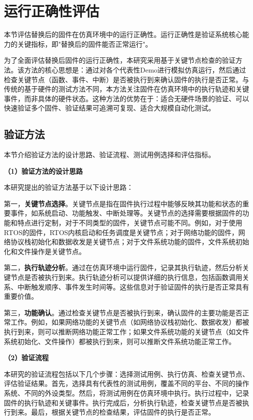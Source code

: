 \section{运行正确性评估}
\label{sec:eval_emu}

本节评估替换后的固件在仿真环境中的运行正确性。运行正确性是验证系统核心能力的关键指标，即"替换后的固件能否正常运行"。

为了全面评估替换后固件的运行正确性，本研究采用基于关键节点检查的验证方法。该方法的核心思想是：通过对各个代表性Demo进行模拟仿真运行，然后通过检查关键节点（函数、事件、中断）是否被执行到来确认固件的执行是否正常。与传统的基于硬件的测试方法不同，本方法关注固件在仿真环境中的执行轨迹和关键事件，而非具体的硬件状态。这种方法的优势在于：适合无硬件场景的验证、可以快速验证多个固件、验证结果可追溯可复现、适合大规模自动化测试。

\subsection{验证方法}

本节介绍验证方法的设计思路、验证流程、测试用例选择和评估指标。

\textbf{（1）验证方法的设计思路}

本研究提出的验证方法基于以下设计思路：

第一，\textbf{关键节点选择}。关键节点是指在固件执行过程中能够反映其功能和状态的重要事件，如系统启动、功能触发、中断处理等。关键节点的选择需要根据固件的功能和特点进行定制，对于不同类型的固件，关键节点可能不同。例如，对于使用RTOS的固件，RTOS内核启动和任务调度是关键节点；对于网络功能的固件，网络协议栈初始化和数据收发是关键节点；对于文件系统功能的固件，文件系统初始化和文件操作是关键节点。

第二，\textbf{执行轨迹分析}。通过在仿真环境中运行固件，记录其执行轨迹，然后分析关键节点是否被执行到来。执行轨迹分析可以提供详细的执行信息，包括函数调用关系、中断触发顺序、事件发生时间等。这些信息对于验证固件的执行是否正常具有重要价值。

第三，\textbf{功能确认}。通过检查关键节点是否被执行到来，确认固件的主要功能是否正常工作。例如，如果网络功能的关键节点（如网络协议栈初始化、数据收发）都被执行到来，则可以推断网络功能正常工作；如果文件系统功能的关键节点（如文件系统初始化、文件操作）都被执行到来，则可以推断文件系统功能正常工作。

\textbf{（2）验证流程}

本研究的验证流程包括以下几个步骤：选择测试用例、执行仿真、检查关键节点、评估验证结果。首先，选择具有代表性的测试用例，覆盖不同的平台、不同的操作系统、不同的外设类型。然后，将测试用例在仿真环境中执行。执行过程中，记录固件的执行轨迹和关键事件。执行完成后，分析执行轨迹，检查关键节点是否被执行到来。最后，根据关键节点的检查结果，评估固件的执行是否正常。

